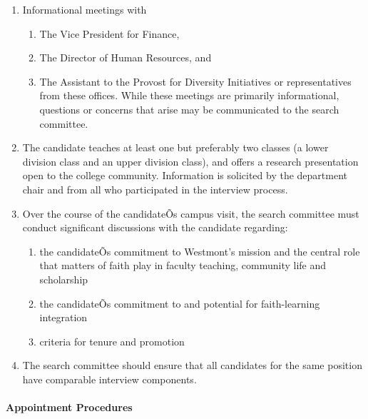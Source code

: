 \documentclass[letterpaper, 11pt]{article}
\begin{document}
\begin{enumerate}[label=\alph*)]
{\begin{enumerate}[label=(\arabic*)]
{\begin{enumerate}[label=$\bullet$]
									\item{and students}
								\end{enumerate}
							}
							\item{Informational meetings with
								\begin{enumerate}[label=$\bullet$]
									\item{The Vice President for Finance,}
									\item{The Director of Human Resources, and}
									\item{The Assistant to the Provost for Diversity Initiatives or representatives from these offices.  While these meetings are primarily informational, questions or concerns that arise may be communicated to the search committee.}
								\end{enumerate}
							}
							\item{The candidate teaches at least one but preferably two classes (a lower division class and an upper division class), and offers a research presentation open to the college community.  Information is solicited by the department chair and from all who participated in the interview process.}
							\item{Over the course of the candidateÕs campus visit, the search committee must conduct significant discussions with the candidate regarding:
								\begin{enumerate}[label=$\bullet$]
									\item{the candidateÕs commitment to Westmont's mission and the central role that matters of faith play in faculty teaching, community life and scholarship}
									\item{the candidateÕs commitment to and potential for faith-learning integration}
									\item{criteria for tenure and promotion}
								\end{enumerate}
							}
							\item{The search committee should ensure that all candidates for the same position have comparable interview components.}
						\end{enumerate}
					}
				\end{enumerate}
			\paragraph{Appointment Procedures}
\end{document}
